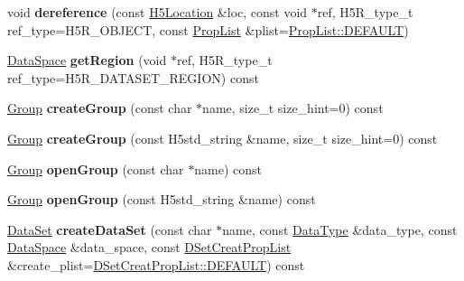 \begin{DoxyCompactItemize}
\item 
\mbox{\label{class_h5_1_1_h5_location_a43fe9cb23e4ab9dd1004308661be59c3}} 
void {\bfseries dereference} (const \hyperlink{class_h5_1_1_h5_location}{H5\+Location} \&loc, const void $\ast$ref, H5\+R\+\_\+type\+\_\+t ref\+\_\+type=H5\+R\+\_\+\+O\+B\+J\+E\+CT, const \hyperlink{class_h5_1_1_prop_list}{Prop\+List} \&plist=\hyperlink{class_h5_1_1_prop_list_ae52af66ce82af0ea7e6dc57148c56241}{Prop\+List\+::\+D\+E\+F\+A\+U\+LT})
\item 
\mbox{\label{class_h5_1_1_h5_location_ab9d61a6cba26e9d38a0efb127c4faa8f}} 
\hyperlink{class_h5_1_1_data_space}{Data\+Space} {\bfseries get\+Region} (void $\ast$ref, H5\+R\+\_\+type\+\_\+t ref\+\_\+type=H5\+R\+\_\+\+D\+A\+T\+A\+S\+E\+T\+\_\+\+R\+E\+G\+I\+ON) const
\item 
\mbox{\label{class_h5_1_1_h5_location_a115ee67b92c2f84526cf0453a0069254}} 
\hyperlink{class_h5_1_1_group}{Group} {\bfseries create\+Group} (const char $\ast$name, size\+\_\+t size\+\_\+hint=0) const
\item 
\mbox{\label{class_h5_1_1_h5_location_a522fab0a3b5a7a2fc45af8e98c9c3c86}} 
\hyperlink{class_h5_1_1_group}{Group} {\bfseries create\+Group} (const H5std\+\_\+string \&name, size\+\_\+t size\+\_\+hint=0) const
\item 
\mbox{\label{class_h5_1_1_h5_location_a7485182fdaf3d859c47bc605e71b809d}} 
\hyperlink{class_h5_1_1_group}{Group} {\bfseries open\+Group} (const char $\ast$name) const
\item 
\mbox{\label{class_h5_1_1_h5_location_a11d21ae5cb8573474e8d25edd787c623}} 
\hyperlink{class_h5_1_1_group}{Group} {\bfseries open\+Group} (const H5std\+\_\+string \&name) const
\item 
\mbox{\label{class_h5_1_1_h5_location_a07b236b42f5cf008e516df6cc241cd22}} 
\hyperlink{class_h5_1_1_data_set}{Data\+Set} {\bfseries create\+Data\+Set} (const char $\ast$name, const \hyperlink{class_h5_1_1_data_type}{Data\+Type} \&data\+\_\+type, const \hyperlink{class_h5_1_1_data_space}{Data\+Space} \&data\+\_\+space, const \hyperlink{class_h5_1_1_d_set_creat_prop_list}{D\+Set\+Creat\+Prop\+List} \&create\+\_\+plist=\hyperlink{class_h5_1_1_d_set_creat_prop_list_aea0be1dc39378736daeac7af787bbc8e}{D\+Set\+Creat\+Prop\+List\+::\+D\+E\+F\+A\+U\+LT}) const

\end{DoxyCompactItemize}
